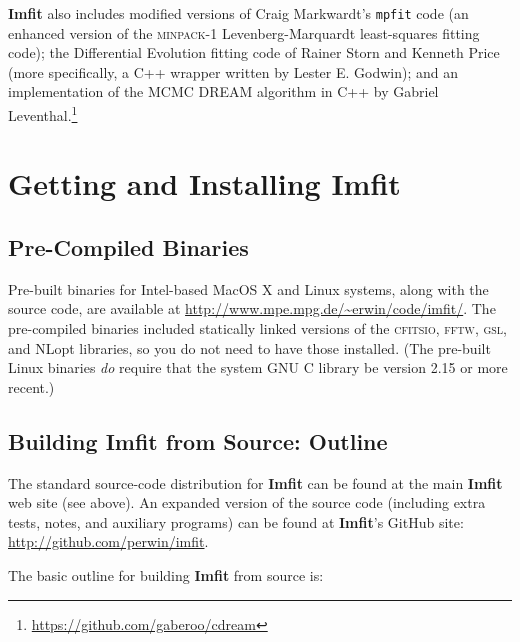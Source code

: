 \documentclass[10pt,a4paper,article]{memoir}
\newcommand{\Imfit}{\textbf{Imfit}}
\begin{document}
\Imfit{} also includes modified versions of Craig Markwardt's
\texttt{mpfit} code (an enhanced version of the \textsc{minpack-1}
Levenberg-Marquardt least-squares fitting code); the Differential
Evolution fitting code of Rainer Storn and Kenneth Price (more
specifically, a C++ wrapper written by Lester E. Godwin); and
an implementation of the MCMC DREAM algorithm in C++ by Gabriel 
Leventhal.\footnote{\url{https://github.com/gaberoo/cdream}}



\newpage

\chapter{Getting and Installing \Imfit{}}

\section{Pre-Compiled Binaries}

Pre-built binaries for Intel-based MacOS X and Linux systems, along with
the source code, are available at
\url{http://www.mpe.mpg.de/~erwin/code/imfit/}. The pre-compiled
binaries included statically linked versions of the \textsc{cfitsio},
\textsc{fftw}, \textsc{gsl}, and NLopt libraries, so you do not need to
have those installed. (The pre-built Linux binaries \textit{do} require
that the system GNU C library be version 2.15 or more recent.)


\section{Building \Imfit{} from Source: Outline}

The standard source-code distribution for \Imfit{} can be found at the
main \Imfit{} web site (see above). An expanded version of the source code
(including extra tests, notes, and auxiliary programs) can be found at
\Imfit's GitHub site: \url{http://github.com/perwin/imfit}.

The basic outline for building \Imfit{} from source is:
\end{document}

